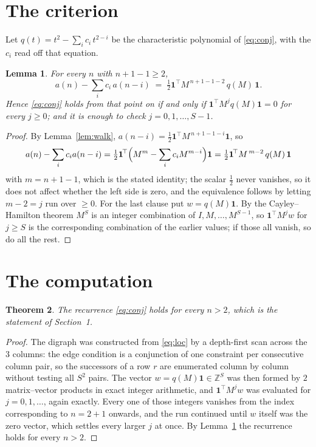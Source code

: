 \documentclass[11pt,a4paper]{article}
\theoremstyle{plain}
\newtheorem{theorem}{Theorem}
\newtheorem{lemma}[theorem]{Lemma}
\theoremstyle{definition}
\begin{document}
\section{The criterion}

Let $q(t)=t^{2}-\sum_i c_i\,t^{2-i}$ be the characteristic polynomial of
\eqref{eq:conj}, with the $c_i$ read off that equation.

\begin{lemma}\label{lem:crit}
For every $n$ with $n+1-1\ge2$,
\[
a(n)-\sum_i c_i\,a(n-i)\;=\;\tfrac1{2}\mathbf{1}^{\!\top}M^{\,n+1-1-2}\,q(M)\,\mathbf{1} .
\]
Hence \eqref{eq:conj} holds from that point on if and only if
$\mathbf{1}^{\!\top}M^{j}q(M)\mathbf{1}=0$ for every $j\ge0$; and it is enough to check
$j=0,1,\dots,S-1$.
\end{lemma}

\begin{proof}
By Lemma~\ref{lem:walk}, $a(n-i)=\tfrac1{2}\mathbf{1}^{\!\top}M^{\,n+1-1-i}\mathbf{1}$, so
\[
a(n)-\sum_i c_i a(n-i)
=\tfrac1{2}\mathbf{1}^{\!\top}\Bigl(M^{m}-\sum_i c_i M^{m-i}\Bigr)\mathbf{1}
=\tfrac1{2}\mathbf{1}^{\!\top}M^{\,m-2}\,q(M)\,\mathbf{1}
\]
with $m=n+1-1$, which is the stated identity; the scalar $\tfrac1{2}$ never vanishes, so it does not affect whether the left side is zero, and the equivalence follows by letting
$m-2=j$ run over $\ge0$. For the last clause put $w=q(M)\mathbf{1}$. By the
Cayley--Hamilton theorem $M^{S}$ is an integer combination of $I,M,\dots,M^{S-1}$, so
$\mathbf{1}^{\!\top}M^{j}w$ for $j\ge S$ is the corresponding combination of the earlier
values; if those all vanish, so do all the rest.
\end{proof}

\section{The computation}

\begin{theorem}
The recurrence \eqref{eq:conj} holds for every $n>2$, which is the statement of
Section~1.
\end{theorem}

\begin{proof}
The digraph was constructed from \eqref{eq:loc} by a depth-first scan across the $3$
columns: the edge condition is a conjunction of one constraint per consecutive column
pair, so the successors of a row $r$ are enumerated column by column without testing all
$S^2$ pairs. The vector $w=q(M)\mathbf{1}\in\mathbb{Z}^{S}$ was then formed by $2$
matrix--vector products in exact integer arithmetic, and $\mathbf{1}^{\!\top}M^{j}w$ was
evaluated for $j=0,1,\dots$, again exactly. Every one of those integers vanishes from the
index corresponding to $n=2+1$ onwards, and the run continued until $w$ itself was the
zero vector, which settles every larger $j$ at once. By Lemma~\ref{lem:crit} the recurrence
holds for every $n>2$.
\end{proof}
\end{document}
